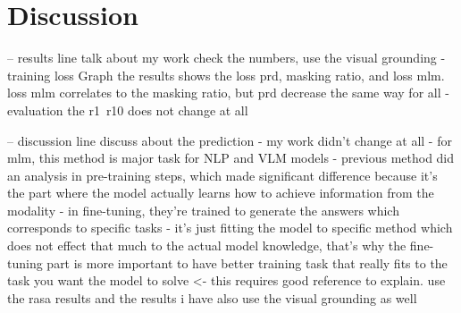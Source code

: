 
\chapter{Discussion}

-- results line 
talk about my work
  check the numbers, use the visual grounding 
  - training loss Graph
  the results shows the loss prd, masking ratio, and loss mlm.
  loss mlm correlates to the masking ratio, but prd decrease the same way for all 
  - evaluation 
  the r1~r10 does not change at all 

-- discussion line
discuss about the prediction 
- my work didn't change at all 
- for mlm, this method is major task for NLP and VLM models
- previous method did an analysis in pre-training steps, which made significant difference because it's the part where the model actually learns how to achieve information from the modality
- in fine-tuning, they're trained to generate the answers which corresponds to specific tasks
- it's just fitting the model to specific method which does not effect that much to the actual model knowledge, that's why the fine-tuning part is more important to have better training task that really fits to the task you want the model to solve <- this requires good reference to explain. use the rasa results and the results i have
  also use the visual grounding as well 


